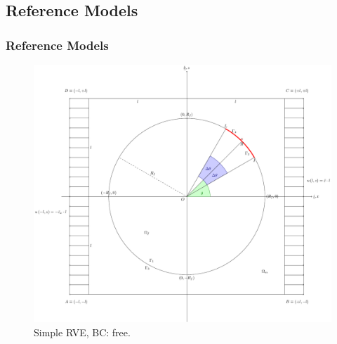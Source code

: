 \documentclass[first,firstsupp,lastsupp,handout,last,hyperref,table]{ETHclass}
\begin{document}
\subsection{Reference Models}

\begin{frame}
\frametitle{Reference Models}
\vspace{-0.25cm}
\centering
\begin{figure}
\centering
\includegraphics[height=0.7\textheight]{LEFM2DsRVEsFsDfreeBCULappAxialDispLR.pdf}
\caption{\scriptsize Simple RVE, BC: free.}
\label{fig:singleRVE-rigid}
\end{figure}
\end{frame}
\end{document}
